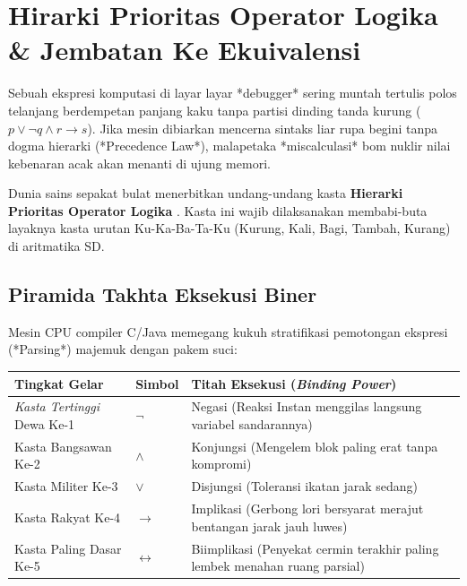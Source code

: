 \section{Hirarki Prioritas Operator Logika \& Jembatan Ke Ekuivalensi}

Sebuah ekspresi komputasi di layar layar *debugger* sering muntah tertulis polos telanjang berdempetan panjang kaku tanpa partisi dinding tanda kurung ($p \lor \neg q \land r \rightarrow s$). Jika mesin dibiarkan mencerna sintaks liar rupa begini tanpa dogma hierarki (*Precedence Law*), malapetaka *miscalculasi* bom nuklir nilai kebenaran acak akan menanti di ujung memori.

Dunia sains sepakat bulat menerbitkan undang-undang kasta \textbf{Hierarki Prioritas Operator Logika} \cite{rosen2019}. Kasta ini wajib dilaksanakan membabi-buta layaknya kasta urutan Ku-Ka-Ba-Ta-Ku (Kurung, Kali, Bagi, Tambah, Kurang) di aritmatika SD. 

\subsection{Piramida Takhta Eksekusi Biner}

Mesin CPU compiler C/Java memegang kukuh stratifikasi pemotongan ekspresi (*Parsing*) majemuk dengan pakem suci:

\begin{center}
	\begin{tabular}{|l|l|l|}
		\hline
		\textbf{Tingkat Gelar} & \textbf{Simbol} & \textbf{Titah Eksekusi (\textit{Binding Power})} \\ 
        \hline
		\textit{Kasta Tertinggi} Dewa Ke-1 & $\neg$ & Negasi (Reaksi Instan menggilas langsung variabel sandarannya) \\ \hline
		Kasta Bangsawan Ke-2 & $\wedge$ & Konjungsi (Mengelem blok paling erat tanpa kompromi) \\ \hline
		Kasta Militer Ke-3 & $\vee$ & Disjungsi (Toleransi ikatan jarak sedang) \\ \hline
		Kasta Rakyat Ke-4 & $\rightarrow$ & Implikasi (Gerbong lori bersyarat merajut bentangan jarak jauh luwes) \\ \hline
		Kasta Paling Dasar Ke-5 & $\leftrightarrow$ & Biimplikasi (Penyekat cermin terakhir paling lembek menahan ruang parsial) \\ \hline
	\end{tabular}
\end{center}

